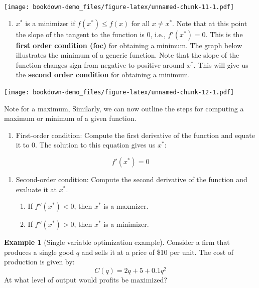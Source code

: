 \documentclass[
]{book}
\providecommand{\tightlist}{%
  \setlength{\itemsep}{0pt}\setlength{\parskip}{0pt}}
\theoremstyle{definition}
\theoremstyle{definition}
\newtheorem{example}{Example}[chapter]
\theoremstyle{definition}
\theoremstyle{definition}
\theoremstyle{remark}
\begin{document}
\texttt{[image: bookdown-demo\_files/figure-latex/unnamed-chunk-11-1.pdf]}

\begin{enumerate}
\def\labelenumi{\arabic{enumi}.}
\setcounter{enumi}{1}
\tightlist
\item
  \(x^*\) is a minimizer if \(f(x^*)\leq f(x)\) for all \(x\neq x^*\). Note that at this point the slope of the tangent to the function is \(0\), i.e., \(f'(x^*)=0\). This is the \textbf{first order condition (foc)} for obtaining a minimum. The graph below illustrates the minimum of a generic function. Note that the slope of the function changes sign from negative to positive around \(x^*\). This will give us the \textbf{second order condition} for obtaining a minimum.
\end{enumerate}

\texttt{[image: bookdown-demo\_files/figure-latex/unnamed-chunk-12-1.pdf]}

Note for a maximum, Similarly, we can now outline the steps for computing a maximum or minimum of a given function.

\begin{enumerate}
\def\labelenumi{\arabic{enumi}.}
\tightlist
\item
  First-order condition: Compute the first derivative of the function and equate it to 0. The solution to this equation gives us \(x^*\):
\end{enumerate}

\[ f'(x^*) = 0\]

\begin{enumerate}
\def\labelenumi{\arabic{enumi}.}
\setcounter{enumi}{1}
\item
  Second-order condition: Compute the second derivative of the function and evaluate it at \(x^*\).

  \begin{enumerate}
  \def\labelenumii{\alph{enumii}.}
  \item
    If \(f''(x^*) < 0\), then \(x^*\) is a maxmizer.
  \item
    If \(f''(x^*) > 0\), then \(x^*\) is a minimizer.
  \end{enumerate}
\end{enumerate}

\begin{example}[Single variable optimization example]
\protect\hypertarget{exm:unnamed-chunk-13}{}\label{exm:unnamed-chunk-13}Consider a firm that produces a single good \(q\) and sells it at a price of \$10 per unit. The cost of production is given by:
\[C(q)=2q+ 5+0.1q^2\]
At what level of output would profits be maximized?
\end{example}
\end{document}
